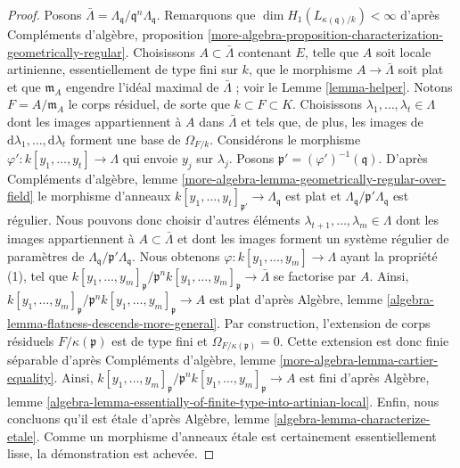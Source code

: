 \begin{proof}
Posons $\bar \Lambda = \Lambda_\mathfrak q/\mathfrak q^n\Lambda_\mathfrak q$.
Remarquons que $\dim H_1(L_{\kappa(\mathfrak q)/k}) < \infty$ d'après
Compléments d'algèbre, proposition
\ref{more-algebra-proposition-characterization-geometrically-regular}.
Choisissons $A \subset \bar \Lambda$ contenant $E$, telle que $A$ soit locale
artinienne, essentiellement de type fini sur $k$, que le morphisme
$A \to \bar \Lambda$ soit plat et que $\mathfrak m_A$ engendre l'idéal maximal
de $\bar \Lambda$ ; voir le Lemme \ref{lemma-helper}.
Notons $F = A/\mathfrak m_A$ le corps résiduel, de sorte que $k \subset F \subset K$.
Choisissons $\lambda_1, \ldots, \lambda_t \in \Lambda$ dont les images
appartiennent à $A$ dans $\bar \Lambda$ et tels que, de plus, les images
de $\text{d}\lambda_1, \ldots, \text{d}\lambda_t$ forment une base
de $\Omega_{F/k}$. Considérons le morphisme
$\varphi' : k[y_1, \ldots, y_t] \to \Lambda$ qui envoie $y_j$ sur $\lambda_j$.
Posons $\mathfrak p' = (\varphi')^{-1}(\mathfrak q)$. D'après
Compléments d'algèbre, lemme
\ref{more-algebra-lemma-geometrically-regular-over-field}
le morphisme d'anneaux $k[y_1, \ldots, y_t]_{\mathfrak p'} \to \Lambda_\mathfrak q$
est plat et $\Lambda_\mathfrak q/\mathfrak p' \Lambda_\mathfrak q$ est
régulier. Nous pouvons donc choisir d'autres éléments
$\lambda_{t + 1}, \ldots, \lambda_m \in \Lambda$
dont les images appartiennent à $A \subset \bar \Lambda$ et dont les
images forment un système régulier de paramètres de
$\Lambda_\mathfrak q/\mathfrak p' \Lambda_\mathfrak q$.
Nous obtenons $\varphi : k[y_1, \ldots, y_m] \to \Lambda$ ayant
la propriété (1), tel que
$k[y_1, \ldots, y_m]_\mathfrak p/\mathfrak p^n k[y_1, \ldots, y_m]_\mathfrak p
\to \bar\Lambda$
se factorise par $A$. Ainsi,
$k[y_1, \ldots, y_m]_\mathfrak p/\mathfrak p^n k[y_1, \ldots, y_m]_\mathfrak p
\to A$ est plat d'après
Algèbre, lemme \ref{algebra-lemma-flatness-descends-more-general}.
Par construction, l'extension de corps résiduels $F/\kappa(\mathfrak p)$
est de type fini et $\Omega_{F/\kappa(\mathfrak p)} = 0$. Cette extension est
donc finie séparable d'après
Compléments d'algèbre, lemme \ref{more-algebra-lemma-cartier-equality}.
Ainsi,
$k[y_1, \ldots, y_m]_\mathfrak p/\mathfrak p^n k[y_1, \ldots, y_m]_\mathfrak p
\to A$
est fini d'après Algèbre, lemme
\ref{algebra-lemma-essentially-of-finite-type-into-artinian-local}.
Enfin, nous concluons qu'il est étale d'après
Algèbre, lemme \ref{algebra-lemma-characterize-etale}.
Comme un morphisme d'anneaux étale est certainement essentiellement lisse, la démonstration est achevée.
\end{proof}

